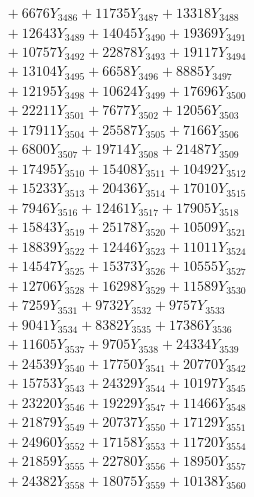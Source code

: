 \documentclass[a4paper,10pt]{article}
\begin{document}
{\begin{align}
&\;  + 6676 Y_{3486} + 11735 Y_{3487} + 13318 Y_{3488} \\[0.3ex]
&\;  + 12643 Y_{3489} + 14045 Y_{3490} + 19369 Y_{3491} \\[0.3ex]
&\;  + 10757 Y_{3492} + 22878 Y_{3493} + 19117 Y_{3494} \\[0.3ex]
&\;  + 13104 Y_{3495} + 6658 Y_{3496} + 8885 Y_{3497} \\[0.3ex]
&\;  + 12195 Y_{3498} + 10624 Y_{3499} + 17696 Y_{3500} \\[0.3ex]
&\;  + 22211 Y_{3501} + 7677 Y_{3502} + 12056 Y_{3503} \\[0.3ex]
&\;  + 17911 Y_{3504} + 25587 Y_{3505} + 7166 Y_{3506} \\[0.3ex]
&\;  + 6800 Y_{3507} + 19714 Y_{3508} + 21487 Y_{3509} \\[0.5ex]\allowbreak
&\;  + 17495 Y_{3510} + 15408 Y_{3511} + 10492 Y_{3512} \\[0.3ex]
&\;  + 15233 Y_{3513} + 20436 Y_{3514} + 17010 Y_{3515} \\[0.3ex]
&\;  + 7946 Y_{3516} + 12461 Y_{3517} + 17905 Y_{3518} \\[0.3ex]
&\;  + 15843 Y_{3519} + 25178 Y_{3520} + 10509 Y_{3521} \\[0.3ex]
&\;  + 18839 Y_{3522} + 12446 Y_{3523} + 11011 Y_{3524} \\[0.3ex]
&\;  + 14547 Y_{3525} + 15373 Y_{3526} + 10555 Y_{3527} \\[0.3ex]
&\;  + 12706 Y_{3528} + 16298 Y_{3529} + 11589 Y_{3530} \\[0.3ex]
&\;  + 7259 Y_{3531} + 9732 Y_{3532} + 9757 Y_{3533} \\[0.3ex]
&\;  + 9041 Y_{3534} + 8382 Y_{3535} + 17386 Y_{3536} \\[0.3ex]
&\;  + 11605 Y_{3537} + 9705 Y_{3538} + 24334 Y_{3539} \\[0.5ex]\allowbreak
&\;  + 24539 Y_{3540} + 17750 Y_{3541} + 20770 Y_{3542} \\[0.3ex]
&\;  + 15753 Y_{3543} + 24329 Y_{3544} + 10197 Y_{3545} \\[0.3ex]
&\;  + 23220 Y_{3546} + 19229 Y_{3547} + 11466 Y_{3548} \\[0.3ex]
&\;  + 21879 Y_{3549} + 20737 Y_{3550} + 17129 Y_{3551} \\[0.3ex]
&\;  + 24960 Y_{3552} + 17158 Y_{3553} + 11720 Y_{3554} \\[0.3ex]
&\;  + 21859 Y_{3555} + 22780 Y_{3556} + 18950 Y_{3557} \\[0.3ex]
&\;  + 24382 Y_{3558} + 18075 Y_{3559} + 10138 Y_{3560} \\[0.3ex]

\end{align}}
\end{document}
